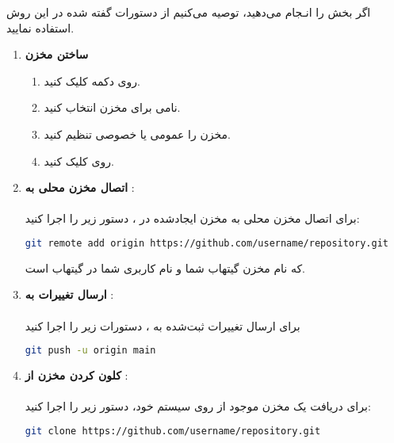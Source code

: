 اگر بخش  را انـجام می‌دهید، توصیه می‌کنیم از دستورات گفته شده در این روش استفاده نمایید.

\begin{enumerate}
    \item \textbf{ساختن مخزن}
    \begin{enumerate}
        \item {روی دکمه  کلیک کنید.}
        \item {نامی برای مخزن انتخاب کنید.}
        \item {مخزن را عمومی یا خصوصی تنظیم کنید.}
        \item {روی   کلیک کنید.}
    \end{enumerate}
    \item \textbf{اتصال مخزن محلی به }:\\\\
    برای اتصال مخزن  محلی به مخزن ایجادشده در ، دستور زیر را اجرا کنید:
    
    \begin{terminal}
    \begin{lstlisting}[language=bash]
    git remote add origin https://github.com/username/repository.git
    \end{lstlisting}
    \end{terminal}

    که  نام مخزن گیتهاب شما و  نام کاربری شما در گیتهاب است.

    \item \textbf{ارسال تغییرات به }:\\\\
    برای ارسال تغییرات ثبت‌شده به ، دستورات زیر را اجرا کنید
    \begin{terminal}
    \begin{lstlisting}[language=bash]
    git push -u origin main
    \end{lstlisting}
    \end{terminal}  
    
    \item \textbf{کلون کردن مخزن از }:\\\\
    برای دریافت یک مخزن موجود از  روی سیستم خود، دستور زیر را اجرا کنید:
    \begin{terminal}
    \begin{lstlisting}[language=bash]
    git clone https://github.com/username/repository.git
    \end{lstlisting}
    \end{terminal} 


\end{enumerate}
